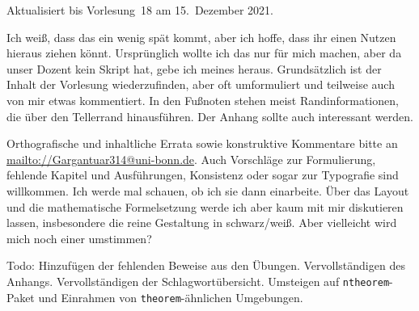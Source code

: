 \documentclass[a4paper]{article}
\begin{document}
\maketitle

\begin{footnotesize}
    Aktualisiert bis Vorlesung~18 am 15.~Dezember 2021.

    Ich weiß, dass das ein wenig spät kommt, aber ich hoffe, dass ihr einen Nutzen hieraus ziehen könnt. Ursprünglich wollte ich das nur für mich machen, aber da unser Dozent kein Skript hat, gebe ich meines heraus. Grundsätzlich ist der Inhalt der Vorlesung wiederzufinden, aber oft umformuliert und teilweise auch von mir etwas kommentiert. In den Fußnoten stehen meist Randinformationen, die über den Tellerrand hinausführen. Der Anhang sollte auch interessant werden.

    Orthografische und inhaltliche Errata sowie konstruktive Kommentare bitte an \url{mailto://Gargantuar314@uni-bonn.de}. Auch Vorschläge zur Formulierung, fehlende Kapitel und Ausführungen, Konsistenz oder sogar zur Typografie sind willkommen. Ich werde mal schauen, ob ich sie dann einarbeite. Über das Layout und die mathematische Formelsetzung werde ich aber kaum mit mir diskutieren lassen, insbesondere die reine Gestaltung in schwarz/weiß. Aber vielleicht wird mich noch einer umstimmen?

    Todo: Hinzufügen der fehlenden Beweise aus den Übungen. Vervollständigen des Anhangs. Vervollständigen der Schlagwortübersicht. Umsteigen auf \texttt{ntheorem}-Paket und Einrahmen von \texttt{theorem}-ähnlichen Umgebungen.
\end{footnotesize}
\end{document}
